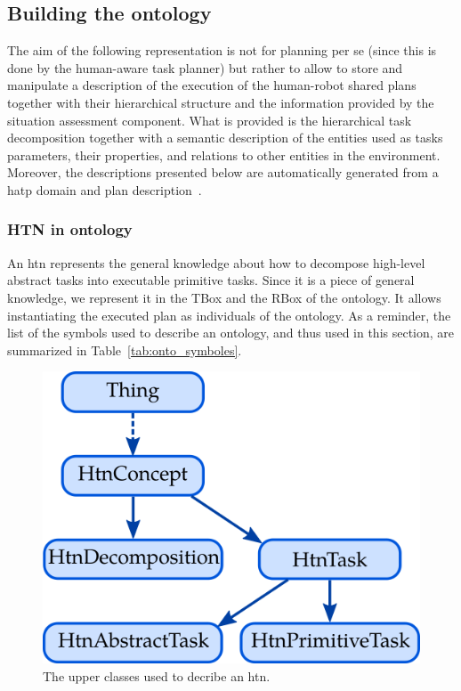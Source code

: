 \subsection{Building the ontology}

The aim of the following representation is not for planning per se (since this is done by the human-aware task planner) but rather to allow to store and manipulate a description of the execution of the human-robot shared plans together with their hierarchical structure and the information provided by the situation assessment component.
What is provided is the hierarchical task decomposition together with a semantic description of the entities used as tasks parameters, their properties, and relations to other entities in the environment. Moreover, the descriptions presented below are automatically generated from a \acrshort{hatp} domain and plan description~\cite{lallement_2014_hatp}.

\subsubsection{HTN in ontology}

An \acrshort{htn} represents the general knowledge about how to decompose high-level abstract tasks into executable primitive tasks. Since it is a piece of general knowledge, we represent it in the TBox and the RBox of the ontology. It allows instantiating the executed plan as individuals of the ontology. As a reminder, the list of the symbols used to describe an ontology, and thus used in this section, are summarized in Table~\ref{tab:onto_symboles}.

\begin{figure}[h!]
\centering
\includegraphics[scale=0.4]{figures/chapter6/tbox_base.png}
\caption{\label{fig:chap6_tbox_base} The upper classes used to decribe an \acrshort{htn}.}
\end{figure}

